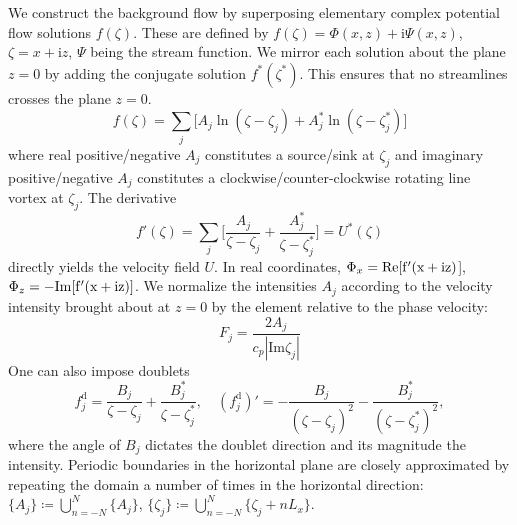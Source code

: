 \documentclass[a4paper,12pt]{article}
\newcommand{\mr}{\mathrm}
\newcommand{\ii}{\mr{i}}
\begin{document}
We construct the background flow by superposing elementary complex potential flow solutions $f(\zeta)$.
These are defined by $f(\zeta) = \Phi(x,z) + \ii\Psi(x,z)$, $\zeta = x + \ii z$, $\Psi$ being the stream function.
We mirror each solution about the plane $z=0$ by adding the conjugate solution $f^*(\zeta^*)$. This ensures that no streamlines crosses the plane $z=0$.
\begin{equation}
f(\zeta) = \sum_j \big[ A_j\ln(\zeta-\zeta_j) + A_j^*\ln(\zeta-\zeta_j^*) \big]
\label{eq:f}
\end{equation}
where real positive/negative $A_j$ constitutes a source/sink at $\zeta_j$ and imaginary positive/negative $A_j$ constitutes a clockwise/counter-clockwise rotating line vortex at $\zeta_j$.
The  derivative
\begin{equation}
f'(\zeta) = \sum_j \bigg[ \frac{A_j}{\zeta-\zeta_j} + \frac{A_j^*}{\zeta-\zeta_j^*} \bigg] = U^*(\zeta)
\label{eq:df}
\end{equation}
directly yields the velocity field $U$. In real coordinates, $\Phi_x = \rm{Re}[f'(x+\ii z)$], $\Phi_z = -\rm{Im}[f'(x+\ii z)]$.
We normalize the intensities $A_j$ according to the velocity intensity brought about at $z=0$ by the element relative to the phase velocity:
\[
F_j = \frac{2A_j}{c_p |\mr{Im}\zeta_j|}
\]
One can also impose doublets
\begin{equation}
f_j^\mr{d} = \frac{B_j}{\zeta-\zeta_j}+\frac{B_j^*}{\zeta-\zeta_j^*},\quad (f^\mr{d}_j)' = -\frac{B_j}{(\zeta-\zeta_j)^2}-\frac{B_j^*}{(\zeta-\zeta_j^*)^2},
\label{eq:doublet}
\end{equation}
where the angle of $B_j$ dictates the doublet direction and its magnitude the intensity.
Periodic boundaries in the horizontal plane are closely approximated by repeating the domain a number of times in the horizontal direction:
$\{A_j\}\coloneqq\bigcup_{n=-N}^N \{A_j\}$, $\{\zeta_j\}\coloneqq\bigcup_{n=-N}^N\{\zeta_j + n L_x \}$.

\end{document}
